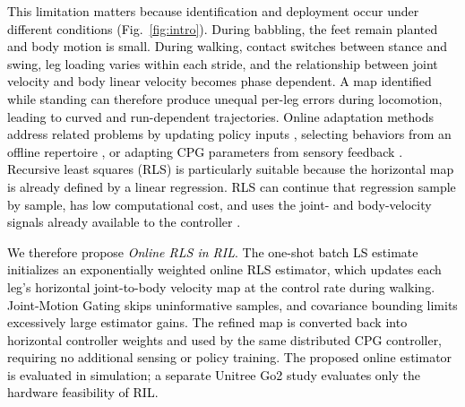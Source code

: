 \documentclass[a4paper, 10pt, conference]{ieeeconf}
\newcommand{\oldtext}[1]{\textcolor{red}{}}
\newcommand{\newtext}[1]{\textcolor{black}{#1}}
\begin{document}
\newtext{This limitation matters because identification and deployment occur
under different conditions (Fig.~\ref{fig:intro}). During babbling, the feet remain planted and body
motion is small. During walking, contact switches between stance and swing,
leg loading varies within each stride, and the relationship between joint velocity
and body linear velocity becomes phase dependent. A map identified while
standing can therefore produce unequal per-leg errors during locomotion, leading
to curved and run-dependent trajectories. Online adaptation methods address
related problems by updating policy inputs \cite{kumar2021}, selecting behaviors
from an offline repertoire \cite{cully2015}, or adapting CPG parameters from
sensory feedback \cite{miguelblanco2020,suzuki2019}. Recursive least
squares (RLS) is particularly suitable because the horizontal map is already
defined by a linear regression. RLS can continue that regression sample by
sample, has low computational cost, and uses the joint- and body-velocity signals
already available to the controller \cite{ljung1999,astrom1995}.}


\newtext{We therefore propose \emph{Online RLS in RIL}. The one-shot batch LS estimate
initializes an exponentially weighted online RLS estimator, which
updates each leg's horizontal joint-to-body velocity map at the control rate
during walking. Joint-Motion Gating skips uninformative samples, and covariance
bounding limits excessively large estimator gains. The refined map is converted
back into horizontal controller weights and used by the same distributed CPG
controller, requiring no additional sensing or policy training. The proposed
online estimator is evaluated in simulation; a separate Unitree Go2 study
evaluates only the hardware feasibility of RIL.}
\end{document}
